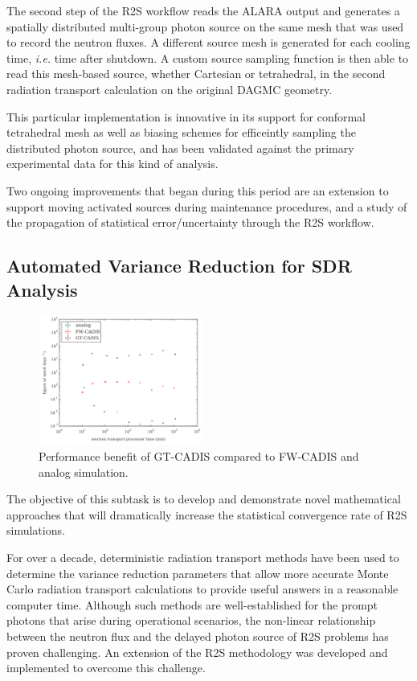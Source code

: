 The second step of the \gls{R2S} workflow reads the ALARA output and generates
a spatially distributed multi-group photon source on the same mesh that was
used to record the neutron fluxes.  A different source mesh is generated for
each cooling time, \emph{i.e.} time after shutdown.  A custom source sampling
function is then able to read this mesh-based source, whether Cartesian or
tetrahedral, in the second radiation transport calculation on the original
\gls{DAGMC} geometry.

This particular implementation is innovative in its support for conformal
tetrahedral mesh as well as biasing schemes for efficeintly sampling the
distributed photon source, and has been validated against the primary
experimental data for this kind of analysis\cite{biondo_r2s}.

Two ongoing improvements that began during this period are an extension to
support moving activated sources during maintenance procedures, and a study of
the propagation of statistical error/uncertainty through the \gls{R2S}
workflow.

\subsection{Automated Variance Reduction for \gls{SDR} Analysis}

\begin{figure}
\centering
\includegraphics[width=0.48\textwidth]{imgs/gt-cadis-timing.png}
\caption{\label{fig:gt-cadis-timing}Performance benefit of \gls{GT-CADIS}
  compared to \gls{FW-CADIS} and analog simulation.}
\end{figure}

The objective of this subtask is to develop and demonstrate novel mathematical
approaches that will dramatically increase the statistical convergence rate of
\gls{R2S} simulations.

For over a decade, deterministic radiation transport methods have been used to
determine the variance reduction parameters that allow more accurate Monte
Carlo radiation transport calculations to provide useful answers in a
reasonable computer time.  Although such methods are well-established for the
prompt photons that arise during operational scenarios, the non-linear
relationship between the neutron flux and the delayed photon source of
\gls{R2S} problems has proven challenging.  An extension of the \gls{R2S}
methodology was developed and implemented to overcome this challenge.


